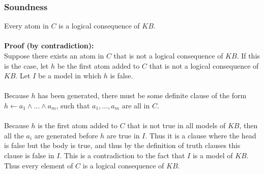 \documentclass{article}
\begin{document}
\subsubsection*{Soundness}
Every atom in $ C $ is a logical consequence of $ KB $.\\
\\
\textbf{Proof (by contradiction):}\\
Suppose there exists an atom in $ C $ that is not a logical consequence of $ KB $. If this is the case, let $ h $ be the first atom added to $ C $ that is not a logical consequence of $ KB $. Let $ I $ be a model in which $ h $ is false.\\\\
Because $ h $ has been generated, there must be some definite clause of the form $ h \leftarrow a_1 \land \dots \land a_m $, such that $ a_1, \dots, a_m $ are all in $ C $.\\
\\
Because $ h $ is the first atom added to $ C $ that is not true in all models of $ KB $, then all the $ a_i $ are generated before $ h $ are true in $ I $. Thus it is a clause where the head is false but the body is true, and thus by the definition of truth clauses this clause is false in $ I $. This is a contradiction to the fact that $ I $ is a model of $ KB $. Thus every element of $ C $ is a logical consequence of $ KB $.
\end{document}
